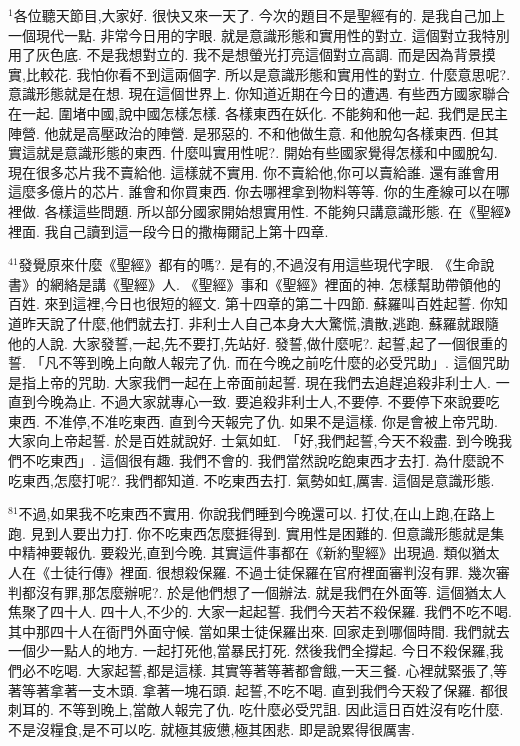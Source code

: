 \documentclass{book}
\begin{document}
$^{1}$各位聽天節目,大家好.
很快又來一天了.
今次的題目不是聖經有的.
是我自己加上一個現代一點.
非常今日用的字眼.
就是意識形態和實用性的對立.
這個對立我特別用了灰色底.
不是我想對立的.
我不是想螢光打亮這個對立高調.
而是因為背景摸實,比較花.
我怕你看不到這兩個字.
所以是意識形態和實用性的對立.
什麼意思呢?.
意識形態就是在想.
現在這個世界上.
你知道近期在今日的遭遇.
有些西方國家聯合在一起.
圍堵中國,說中國怎樣怎樣.
各樣東西在妖化.
不能夠和他一起.
我們是民主陣營.
他就是高壓政治的陣營.
是邪惡的.
不和他做生意.
和他脫勾各樣東西.
但其實這就是意識形態的東西.
什麼叫實用性呢?.
開始有些國家覺得怎樣和中國脫勾.
現在很多芯片我不賣給他.
這樣就不實用.
你不賣給他,你可以賣給誰.
還有誰會用這麼多億片的芯片.
誰會和你買東西.
你去哪裡拿到物料等等.
你的生產線可以在哪裡做.
各樣這些問題.
所以部分國家開始想實用性.
不能夠只講意識形態.
在《聖經》裡面.
我自己讀到這一段今日的撒梅爾記上第十四章.

$^{41}$發覺原來什麼《聖經》都有的嗎?.
是有的,不過沒有用這些現代字眼.
《生命說書》的網絡是講《聖經》人.
《聖經》事和《聖經》裡面的神.
怎樣幫助帶領他的百姓.
來到這裡,今日也很短的經文.
第十四章的第二十四節.
蘇羅叫百姓起誓.
你知道昨天說了什麼,他們就去打.
非利士人自己本身大大驚慌,潰散,逃跑.
蘇羅就跟隨他的人說.
大家發誓,一起,先不要打,先站好.
發誓,做什麼呢?.
起誓,起了一個很重的誓.
「凡不等到晚上向敵人報完了仇.
而在今晚之前吃什麼的必受咒助」.
這個咒助是指上帝的咒助.
大家我們一起在上帝面前起誓.
現在我們去追趕追殺非利士人.
一直到今晚為止.
不過大家就專心一致.
要追殺非利士人,不要停.
不要停下來說要吃東西.
不准停,不准吃東西.
直到今天報完了仇.
如果不是這樣.
你是會被上帝咒助.
大家向上帝起誓.
於是百姓就說好.
士氣如虹.
「好,我們起誓,今天不殺盡.
到今晚我們不吃東西」.
這個很有趣.
我們不會的.
我們當然說吃飽東西才去打.
為什麼說不吃東西,怎麼打呢?.
我們都知道.
不吃東西去打.
氣勢如虹,厲害.
這個是意識形態.

$^{81}$不過,如果我不吃東西不實用.
你說我們睡到今晚還可以.
打仗,在山上跑,在路上跑.
見到人要出力打.
你不吃東西怎麼捱得到.
實用性是困難的.
但意識形態就是集中精神要報仇.
要殺光,直到今晚.
其實這件事都在《新約聖經》出現過.
類似猶太人在《士徒行傳》裡面.
很想殺保羅.
不過士徒保羅在官府裡面審判沒有罪.
幾次審判都沒有罪,那怎麼辦呢?.
於是他們想了一個辦法.
就是我們在外面等.
這個猶太人焦聚了四十人.
四十人,不少的.
大家一起起誓.
我們今天若不殺保羅.
我們不吃不喝.
其中那四十人在衙門外面守候.
當如果士徒保羅出來.
回家走到哪個時間.
我們就去一個少一點人的地方.
一起打死他,當暴民打死.
然後我們全撐起.
今日不殺保羅,我們必不吃喝.
大家起誓,都是這樣.
其實等著等著都會餓,一天三餐.
心裡就緊張了,等著等著拿著一支木頭.
拿著一塊石頭.
起誓,不吃不喝.
直到我們今天殺了保羅.
都很刺耳的.
不等到晚上,當敵人報完了仇.
吃什麼必受咒詛.
因此這日百姓沒有吃什麼.
不是沒糧食,是不可以吃.
就極其疲憊,極其困悲.
即是說累得很厲害.
\end{document}
